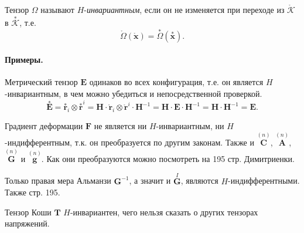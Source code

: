 \begin{definition*}
	Тензор $\Omega$ называют $H$-\textit{инвариантным}, если он не изменяется при переходе из $\mathring{\mathcal{K}}$ в $\overset{\ast}{\mathcal{K}}$, т.е.
	\begin{equation*}
		\mathring{\Omega}(\mathring{\mathbf{x}}) = \overset{\ast}{\Omega}(\overset{\ast}{\mathbf{x}}).
	\end{equation*}
\end{definition*}


\paragraph{Примеры. } Метрический тензор $\mathbf{E}$ одинаков во всех конфигурация, т.е. он является $H$-инвариантным, в чем можно убедиться и непосредственной проверкой. 
\begin{equation*}
	\overset{\ast}{\mathbf{E}} = \overset{\ast}{\mathbf{r}}_i \otimes \overset{\ast}{\mathbf{r}}^i = \mathbf{H} \cdot \mathring{\mathbf{r}}_i \otimes \mathring{\mathbf{r}}^i \cdot \mathbf{H}^{-1} = \mathbf{H} \cdot \mathbf{E} \cdot \mathbf{H}^{-1} = \mathbf{H} \cdot \mathbf{H}^{-1} = \mathbf{E}.
\end{equation*}

Градиент деформации $\mathbf{F}$ не является ни $H$-инвариантным, ни $H$-индифферентным, т.к. он преобразуется по другим законам. Также и $\overset{(n)}{\mathbf{C}}$, $\overset{(n)}{\mathbf{A}}$, $\overset{(n)}{\mathbf{G}}$ и $\overset{(n)}{\mathbf{g}}$. Как они преобразуются можно посмотреть на 195 стр. Димитриенки. 

Только правая мера Альманзи $\mathbf{G}^{-1}$, а значит и $\overset{I}{\mathbf{G}}$, являются $H$-индифферентными. Также стр. 195.

Тензор Коши $\mathbf{T}$ $H$-инвариантен, чего нельзя сказать о других тензорах напряжений.
